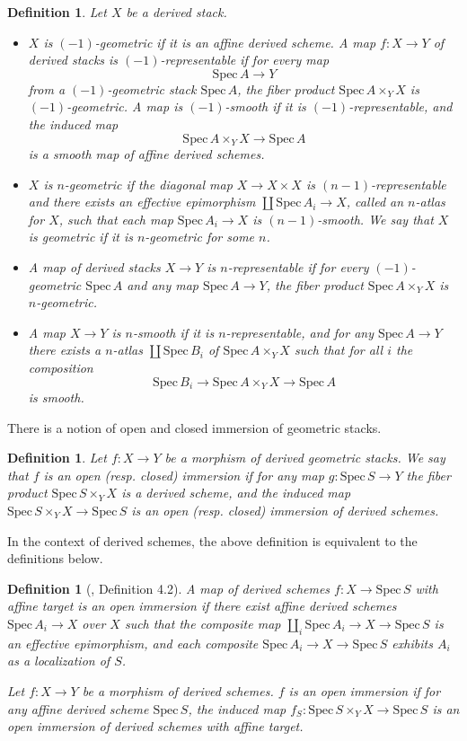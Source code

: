 \documentclass[11pt,letterpaper]{amsart}
\newtheorem{definition}[dummy]{Definition}
\newcommand{\Spec}{\mathrm{S}\mathrm{pec}\,}
\begin{document}
\begin{definition}
Let $X$ be a derived stack.
\begin{itemize}
\item $X$ is $(-1)$-geometric if it is an affine derived scheme. A map $f:X\rightarrow Y$ of derived stacks is $(-1)$-representable if for every map $$\Spec A\rightarrow Y$$ from a $(-1)$-geometric stack $\Spec A$, the fiber product $\Spec A\times_Y X$ is $(-1)$-geometric. A map is $(-1)$-smooth if it is $(-1)$-representable, and the induced map $$\Spec A\times_Y X\rightarrow\Spec A$$ is a smooth map of affine derived schemes.

\item 
$X$ is $n$-geometric if the diagonal map $X\rightarrow X\times X$ is $(n-1)$-representable and there exists an effective epimorphism $\coprod\Spec A_i\rightarrow X$, called an $n$-atlas for $X$, such that each map $\Spec A_i\rightarrow X$ is $(n-1)$-smooth. We say that $X$ is geometric if it is $n$-geometric for some $n$.
\item A map of derived stacks $X\rightarrow Y$ is $n$-representable if for every $(-1)$-geometric $\Spec A$ and any map $\Spec A\rightarrow Y$, the fiber product $\Spec A\times_Y X$ is $n$-geometric. 
\item A map $X\rightarrow Y$ is $n$-smooth if it is $n$-representable, and for any $\Spec A\rightarrow Y$ there exists a $n$-atlas $\coprod\Spec B_i$ of $\Spec A\times_Y X$ such that for all $i$ the composition $$\Spec B_i\rightarrow \Spec A\times_Y X\rightarrow \Spec A$$ is smooth.
\end{itemize}
\end{definition}

There is a notion of open and closed immersion of geometric stacks. 
\begin{definition}
Let $f:X\rightarrow Y$ be a morphism of derived geometric stacks. We say that  $f$ is an \emph{open} (resp. \emph{closed}) \emph{immersion} if for any map $g:\Spec S\rightarrow Y$ the fiber product $\Spec S\times_Y X$ is a derived scheme, and the induced map $\Spec S\times_Y X\rightarrow\Spec S$ is an open (resp. closed) immersion of derived schemes.
\end{definition}
In the context of derived schemes, the above definition is equivalent to the definitions below.
\begin{definition}[\cite{PanVez}, Definition 4.2]
 A map of derived schemes $f:X\rightarrow\Spec S$ with affine target is an \emph{open immersion} if there exist affine derived schemes $\Spec A_i\rightarrow X$ over $X$ such that the composite map $\coprod_i\Spec A_i\rightarrow X\rightarrow\Spec S$ is an effective epimorphism, and each composite $\Spec A_i\rightarrow X\rightarrow\Spec S$ exhibits $A_i$ as a localization of $S$.

Let $f:X\rightarrow Y$ be a morphism of derived schemes. $f$ is an \emph{open immersion} if for any affine derived scheme $\Spec S$, the induced map $f_S:\Spec S\times_Y X\rightarrow \Spec S$ is an open immersion of derived schemes with affine target. 
\end{definition}
\end{document}
